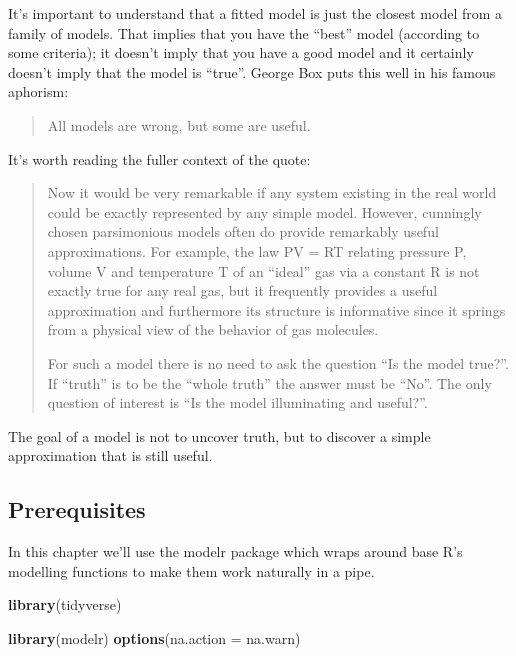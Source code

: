 \documentclass[]{book}
\newenvironment{Shaded}{\begin{snugshade}}{\end{snugshade}}
\newcommand{\KeywordTok}[1]{\textcolor[rgb]{0.13,0.29,0.53}{\textbf{{#1}}}}
\newcommand{\DataTypeTok}[1]{\textcolor[rgb]{0.13,0.29,0.53}{{#1}}}
\newcommand{\NormalTok}[1]{{#1}}
\begin{document}
It's important to understand that a fitted model is just the closest
model from a family of models. That implies that you have the ``best''
model (according to some criteria); it doesn't imply that you have a
good model and it certainly doesn't imply that the model is ``true''.
George Box puts this well in his famous aphorism:

\begin{quote}
All models are wrong, but some are useful.
\end{quote}

It's worth reading the fuller context of the quote:

\begin{quote}
Now it would be very remarkable if any system existing in the real world
could be exactly represented by any simple model. However, cunningly
chosen parsimonious models often do provide remarkably useful
approximations. For example, the law PV = RT relating pressure P, volume
V and temperature T of an ``ideal'' gas via a constant R is not exactly
true for any real gas, but it frequently provides a useful approximation
and furthermore its structure is informative since it springs from a
physical view of the behavior of gas molecules.

For such a model there is no need to ask the question ``Is the model
true?''. If ``truth'' is to be the ``whole truth'' the answer must be
``No''. The only question of interest is ``Is the model illuminating and
useful?''.
\end{quote}

The goal of a model is not to uncover truth, but to discover a simple
approximation that is still useful.

\subsection{Prerequisites}\label{prerequisites-15}

In this chapter we'll use the modelr package which wraps around base R's
modelling functions to make them work naturally in a pipe.

\begin{Shaded}
\begin{Highlighting}[]
\KeywordTok{library}\NormalTok{(tidyverse)}

\KeywordTok{library}\NormalTok{(modelr)}
\KeywordTok{options}\NormalTok{(}\DataTypeTok{na.action =} \NormalTok{na.warn)}
\end{Highlighting}
\end{Shaded}
\end{document}
